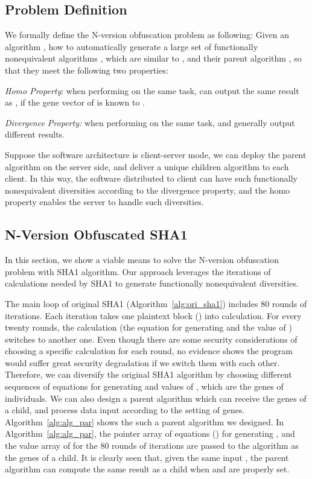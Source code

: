 \documentclass[10pt, conference]{IEEEtran}
\begin{document}
\subsection{Problem Definition}
We formally define the N-version obfuscation problem as following: Given an algorithm , how to automatically generate a large set of functionally nonequivalent algorithms , which are similar to , and their parent algorithm , so that they meet the following two properties:

\textit{Homo Property}: when performing on the same task,  can output the same result as , if the gene vector  of  is known to .  

\textit{Divergence Property:} when performing on the same task,  and  generally output different results. 

Suppose the software architecture is client-server mode, we can deploy the parent algorithm on the server side, and deliver a unique children algorithm to each client.  In this way, the software distributed to client can have such functionally nonequivalent diversities according to the divergence property, and the homo property enables the server to handle such diversities.

\subsection{N-Version Obfuscated SHA1}

In this section, we show a viable means to solve the N-version obfuscation problem with SHA1 algorithm.  Our approach leverages the iterations of calculations needed by SHA1 to generate functionally nonequivalent diversities.

The main loop of original SHA1 (Algorithm~\ref{alg:ori_sha1}) includes 80 rounds of iterations.  Each iteration takes one plaintext block () into calculation.  For every twenty rounds, the calculation (the equation for generating  and the value of ) switches to another one.  Even though there are some security considerations of choosing a specific calculation for each round, no evidence shows the program would suffer great security degradation if we switch them with each other.  Therefore, we can diversify the original SHA1 algorithm by choosing different sequences of equations for generating  and values of , which are the genes of individuals.  We can also design a parent algorithm which can receive the genes of a child, and process data input according to the setting of genes.  Algorithm~\ref{alg:alg_par} shows the such a parent algorithm we designed.  In Algorithm~\ref{alg:alg_par}, the pointer array of equations () for generating , and the value array of  for the 80 rounds of iterations are passed to the algorithm as the genes of a child.  It is clearly seen that, given the same input , the parent algorithm can compute the same result as a child when  and  are properly set.
\end{document}
